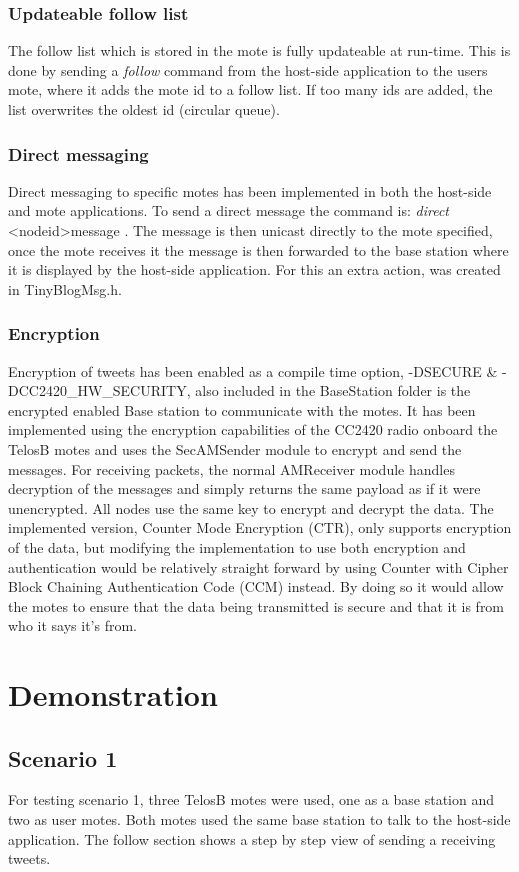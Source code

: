 \documentclass{article}
\begin{document}
\subsubsection{Updateable follow list}
The follow list which is stored in the mote is fully updateable at run-time. This is done by sending a \textit{follow} command from the host-side application to the users mote, where it adds the mote id to a follow list. If too many ids are added, the list overwrites the oldest id (circular queue).
\subsubsection{Direct messaging}
Direct messaging to specific motes has been implemented in both the host-side and mote applications. To send a direct message the command is: \textit{direct} \textless nodeid\textgreater message .
The message is then unicast directly to the mote specified, once the mote receives it the message is then forwarded to the base station where it is displayed by the host-side application. For this an extra action, was created in TinyBlogMsg.h.
\subsubsection{Encryption}
Encryption of tweets has been enabled as a compile time option, -DSECURE \& -DCC2420\_HW\_SECURITY, also included in the BaseStation folder is the encrypted enabled Base station to communicate with the motes. It has been implemented using the encryption capabilities of the CC2420 radio onboard the TelosB motes and uses the SecAMSender module to encrypt and send the messages. For receiving packets, the normal AMReceiver module handles decryption of the messages and simply returns the same payload as if it were unencrypted. All nodes use the same key to encrypt and decrypt the data.
The implemented version, Counter Mode Encryption (CTR), only supports encryption of the data, but modifying the implementation to use both encryption and authentication would be relatively straight forward by using Counter with Cipher Block Chaining Authentication Code (CCM) instead. By doing so it would allow the motes to ensure that the data being transmitted is secure and that it is from who it says it's from. 


\section{Demonstration}
\subsection{Scenario 1}
For testing scenario 1, three TelosB motes were used, one as a base station and two as user motes. Both motes used the same base station to talk to the host-side application. The follow section shows a step by step view of sending a receiving tweets.
\end{document}
